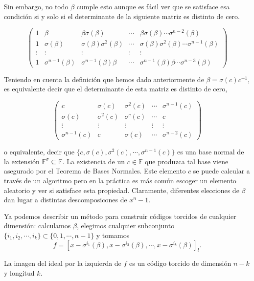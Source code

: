 Sin embargo, no todo $\beta$ cumple esto aunque es fácil ver que se satisface esa condición si y solo si el determinante de la siguiente matriz es distinto de cero.

\[
 \left( \begin{array}{ccccc}
	1 & \beta & \beta\sigma(\beta) & \cdots & \beta\sigma(\beta) \cdots \sigma^{n-2}(\beta)  \\
	1 & \sigma(\beta) & \sigma(\beta)\sigma^2(\beta) & \cdots & \sigma(\beta)\sigma^2(\beta) \cdots \sigma^{n-1}(\beta)   \\
	\vdots & \vdots & \vdots & \vdots & \vdots  \\
	1 & \sigma^{n-1}(\beta) & \sigma^{n-1}(\beta)\beta & \cdots & \sigma^{n-1}(\beta)\beta \cdots \sigma^{n-3}(\beta)   
			\end{array} 
	\right)
\]

Teniendo en cuenta la definición que hemos dado anteriormente de $\beta = \sigma(c)c^{-1}$, es equivalente decir que el determinante de esta matriz es distinto de cero,

\[
 \left( \begin{array}{ccccc}
	c & \sigma(c) & \sigma^2(c) & \cdots & \sigma^{n-1}(c)  \\
	\sigma(c) & \sigma^2(c) & \sigma^c(c) & \cdots & c   \\
	\vdots & \vdots & \vdots & \vdots & \vdots  \\
	 \sigma^{n-1}(c) & c & \sigma(c) & \cdots & \sigma^{n-2}(c)
			\end{array} 
	\right)
\]

o equivalente, decir que $\{ c,\sigma(c),\sigma^2(c),\cdots,\sigma^{n-1}(c) \}$ es una base normal de la extensión $\mathbb{F}^{\sigma} \subseteq \mathbb{F}$. La existencia de un $c \in \mathbb{F}$ que produzca tal base viene asegurado por el Teorema de Bases Normales. %
Este elemento $c$ se puede calcular a través de un algoritmo pero en la práctica es más común escoger un elemento aleatorio y ver si satisface esta propiedad. Claramente, diferentes elecciones de $\beta$ dan lugar a distintas descomposicones de $x^n-1$.

Ya podemos describir un método para construir códigos torcidos de cualquier dimensión: calculamos $\beta$, elegimos cualquier subconjunto $\{ i_1,i_2,\cdots,i_k \} \subset \{ 0,1,\cdots,n-1\}$ y tomamos 
\[ f = [x-\sigma^{i_1}(\beta),x-\sigma^{i_2}(\beta),\cdots, x-\sigma^{i_k}(\beta)]_l .\]

La imagen del ideal por la izquierda de $f$ es un código torcido de dimensión $n-k$ y longitud $k$.

